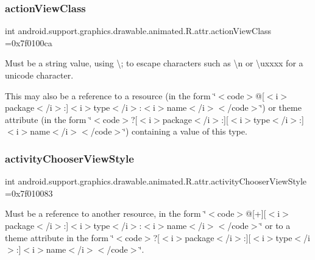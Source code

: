 \subsubsection{\texorpdfstring{action\+View\+Class}{actionViewClass}}
{\footnotesize\ttfamily int android.\+support.\+graphics.\+drawable.\+animated.\+R.\+attr.\+action\+View\+Class =0x7f0100ca\hspace{0.3cm}{\ttfamily [static]}}

Must be a string value, using \textquotesingle{}\textbackslash{};\textquotesingle{} to escape characters such as \textquotesingle{}\textbackslash{}n\textquotesingle{} or \textquotesingle{}\textbackslash{}uxxxx\textquotesingle{} for a unicode character. 

This may also be a reference to a resource (in the form \char`\"{}$<$code$>$@\mbox{[}$<$i$>$package$<$/i$>$\+:\mbox{]}$<$i$>$type$<$/i$>$\+:$<$i$>$name$<$/i$>$$<$/code$>$\char`\"{}) or theme attribute (in the form \char`\"{}$<$code$>$?\mbox{[}$<$i$>$package$<$/i$>$\+:\mbox{]}\mbox{[}$<$i$>$type$<$/i$>$\+:\mbox{]}$<$i$>$name$<$/i$>$$<$/code$>$\char`\"{}) containing a value of this type. \mbox{\label{classandroid_1_1support_1_1graphics_1_1drawable_1_1animated_1_1R_1_1attr_a64d092e6db1dbc0c3f57b8223412be96}} 
\subsubsection{\texorpdfstring{activity\+Chooser\+View\+Style}{activityChooserViewStyle}}
{\footnotesize\ttfamily int android.\+support.\+graphics.\+drawable.\+animated.\+R.\+attr.\+activity\+Chooser\+View\+Style =0x7f010083\hspace{0.3cm}{\ttfamily [static]}}

Must be a reference to another resource, in the form \char`\"{}$<$code$>$@\mbox{[}+\mbox{]}\mbox{[}$<$i$>$package$<$/i$>$\+:\mbox{]}$<$i$>$type$<$/i$>$\+:$<$i$>$name$<$/i$>$$<$/code$>$\char`\"{} or to a theme attribute in the form \char`\"{}$<$code$>$?\mbox{[}$<$i$>$package$<$/i$>$\+:\mbox{]}\mbox{[}$<$i$>$type$<$/i$>$\+:\mbox{]}$<$i$>$name$<$/i$>$$<$/code$>$\char`\"{}. \mbox{\label{classandroid_1_1support_1_1graphics_1_1drawable_1_1animated_1_1R_1_1attr_a12dd56bf73cf57802d89523875001af5}} 
